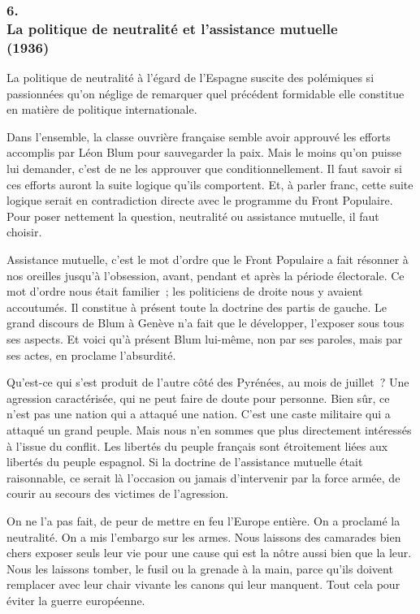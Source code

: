 \documentclass[french,twoside]{book} %
\begin{document}
\subsubsection[{6. La politique de neutralité et l’assistance mutuelle, (1936)}]{6. \\
La politique de neutralité et l’assistance mutuelle \\
(1936)}
\noindent \par
La politique de neutralité à l'égard de l'Espagne suscite des polémiques si passionnées qu'on néglige de remarquer quel précédent formidable elle constitue en matière de politique internationale.\par
Dans l'ensemble, la classe ouvrière française semble avoir approuvé les efforts accomplis par Léon Blum pour sauvegarder la paix. Mais le moins qu'on puisse lui demander, c'est de ne les approuver que conditionnellement. Il faut savoir si ces efforts auront la suite logique qu'ils comportent. Et, à parler franc, cette suite logique serait en contradiction directe avec le programme du Front Populaire. Pour poser nettement la question, neutralité ou assistance mutuelle, il faut choisir.\par
Assistance mutuelle, c'est le mot d'ordre que le Front Populaire a fait résonner à nos oreilles jusqu'à l'obsession, avant, pendant et après la période électorale. Ce mot d'ordre nous était familier ; les politiciens de droite nous y avaient accoutumés. Il constitue à présent toute la doctrine des partis de gauche. Le grand discours de Blum à Genève n'a fait que le développer, l'exposer sous tous ses aspects. Et voici qu'à présent Blum lui-même, non par ses paroles, mais par ses actes, en proclame l'absurdité.\par
Qu'est-ce qui s'est produit de l'autre côté des Pyrénées, au mois de juillet ? Une agression caractérisée, qui ne peut faire de doute pour personne. Bien sûr, ce n'est pas une nation qui a attaqué une nation. C'est une caste militaire qui a attaqué un grand peuple. Mais nous n'en sommes que plus directement intéres­sés à l'issue du conflit. Les libertés du peuple français sont étroitement liées aux libertés du peuple espagnol. Si la doctrine de l'assistance mutuelle était raisonnable, ce serait là l'occasion ou jamais d'intervenir par la force armée, de courir au secours des victimes de l'agression.\par
On ne l'a pas fait, de peur de mettre en feu l'Europe entière. On a proclamé la neutralité. On a mis l'embargo sur les armes. Nous laissons des camarades bien chers exposer seuls leur vie pour une cause qui est la nôtre aussi bien que la leur. Nous les laissons tomber, le fusil ou la grenade à la main, parce qu'ils doivent remplacer avec leur chair vivante les canons qui leur manquent. Tout cela pour éviter la guerre européenne.\par
\end{document}
